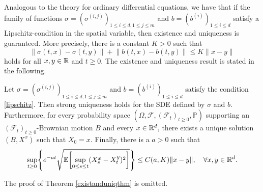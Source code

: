 Analogous to the theory for ordinary differential equations, we have that if the family of functions $\sigma=(\sigma^{(i,j)})_{1\leq i\leq d, 1\leq j\leq m}$ and $b=(b^{(i)})_{1\leq i\leq d}$ satisfy a Lipschitz-condition in the spatial variable, then existence and uniqueness is guaranteed. More precisely, there is a constant $K>0$ such that
\begin{equation}\label{lipschitz}
    \lVert \sigma(t,x)-\sigma(t,y)\rVert+ \lVert b(t,x)-b(t,y)\rVert \leq K\lVert x-y\rVert
\end{equation}
holds for all $x,y\in\mathbb{R}$ and $t\geq 0$. The existence and uniqueness result is stated in the following.
\begin{thm}\label{existanduniqthm} Let $\sigma=(\sigma^{(i,j)})_{1\leq i\leq d, 1\leq j\leq m}$ and $b=(b^{(i)})_{1\leq i\leq d}$ satisfy the condition \eqref{lipschitz}. Then strong uniqueness holds for the SDE defined by $\sigma$ and $b$. Furthermore, for every probability space $(\Omega,\mathcal{F},(\mathcal{F}_{t})_{t\geq 0},\mathbb{P})$ supporting an $(\mathcal{F}_{t})_{t\geq 0}$-Brownian motion $B$ and every $x\in \mathbb{R}^d$, there exists a unique solution $(B,X^{x})$ such that $X_{0}=x$. Finally, there is a $a>0$ such that
\begin{equation}
    \sup_{t\geq 0}\left\{e^{-at}\sqrt{\mathbb{E}\left[\sup_{0\leq s\leq t}(X_{s}^{x}-X_{t}^{y})^{2}\right]}\right\}\leq C(a,K)\lVert x-y\rVert, \quad \forall x,y\in\R^{d}.
\end{equation}
\end{thm}
The proof of Theorem \ref{existanduniqthm} is omitted.

